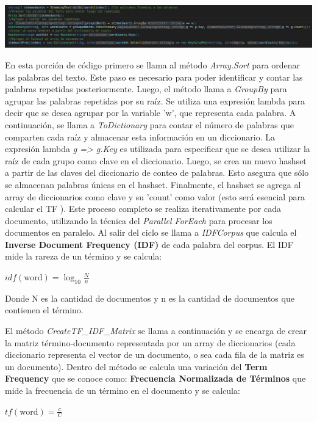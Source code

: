 \documentclass{article}
\begin{document}
\vspace{0.5cm}
\includegraphics[width=0.5\linewidth]{stemdoc.png}
\vspace{0.5cm}

En esta porción de código primero se llama al método \textit{Array.Sort} para ordenar las palabras del texto. Este paso es necesario para poder identificar y contar las palabras repetidas posteriormente. Luego, el método llama a \textit{GroupBy} para agrupar las palabras repetidas por su raíz. Se utiliza una expresión lambda para decir que se desea agrupar por la variable 'w', que representa cada palabra. A continuación, se llama a \textit{ToDictionary} para contar el número de palabras que comparten cada raíz y almacenar esta información en un diccionario. La expresión lambda \textit{g => g.Key} es utilizada para especificar que se desea utilizar la raíz de cada grupo como clave en el diccionario. Luego, se crea un nuevo hashset a partir de las claves del diccionario de conteo de palabras. Esto asegura que sólo se almacenan palabras únicas en el hashset. Finalmente, el hashset se agrega al array de diccionarios como clave y su 'count' como valor (esto será esencial para calcular el TF ). Este proceso completo se realiza iterativamente por cada documento, utilizando la técnica del \textit{Parallel ForEach} para procesar los documentos en paralelo. Al salir del ciclo se llama a \textit{IDFCorpus} que calcula el \textbf{Inverse Document Frequency (IDF)} de cada palabra del corpus. El IDF mide la rareza de un término y se calcula:

\vspace{0.3cm}
$idf(\text{word}) = \log_{10}\frac{N}{n}$
\newline

Donde N es la cantidad de documentos y n es la cantidad de documentos que contienen el término.

El método \textit{CreateTF\_IDF\_Matrix} se llama a continuación y se encarga de crear la matriz término-documento representada por un array de diccionarios (cada diccionario representa el vector de un documento, o sea cada fila de la matriz es un documento). Dentro del método se calcula una variación del \textbf{Term Frequency} que se conoce como: \textbf{Frecuencia Normalizada de Términos} que mide la frecuencia de un término en el documento y se calcula:

\vspace{0.3cm}
$tf(\text{word}) = \frac{c}{C}$
\newline
\end{document}
